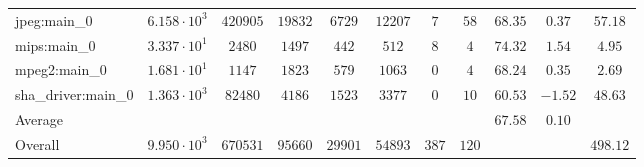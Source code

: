 \begin{tabular}{|l|c|c|c|c|c|c|c|c|c|c|}
jpeg:main\_0            & $ 6.158 \cdot 10^{3} $ & $ 420905 $ & $ 19832 $ & $ 6729  $ & $ 12207 $ & $ 7   $ & $ 58  $ & $ 68.35       $ & $ 0.37    $ & $ 57.18   $ \\
mips:main\_0            & $ 3.337 \cdot 10^{1} $ & $ 2480   $ & $ 1497  $ & $ 442   $ & $ 512   $ & $ 8   $ & $ 4   $ & $ 74.32       $ & $ 1.54    $ & $ 4.95    $ \\
mpeg2:main\_0           & $ 1.681 \cdot 10^{1} $ & $ 1147   $ & $ 1823  $ & $ 579   $ & $ 1063  $ & $ 0   $ & $ 4   $ & $ 68.24       $ & $ 0.35    $ & $ 2.69    $ \\
sha\_driver:main\_0     & $ 1.363 \cdot 10^{3} $ & $ 82480  $ & $ 4186  $ & $ 1523  $ & $ 3377  $ & $ 0   $ & $ 10  $ & $ 60.53       $ & $ -1.52   $ & $ 48.63   $ \\
\hline
Average                 & $                    $ & $        $ & $       $ & $       $ & $       $ & $     $ & $     $ & $ 67.58       $ & $ 0.10    $ & $         $ \\
\hline
Overall                 & $ 9.950 \cdot 10^{3} $ & $ 670531 $ & $ 95660 $ & $ 29901 $ & $ 54893 $ & $ 387 $ & $ 120 $ & $             $ & $         $ & $ 498.12  $ \\
\hline
\end{tabular}
